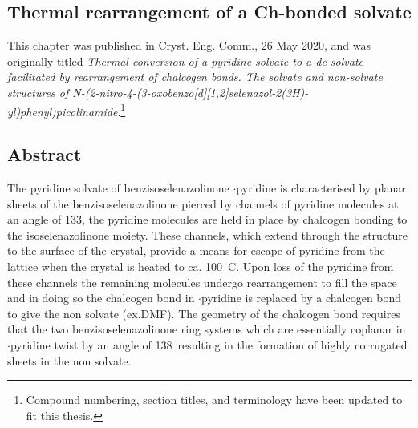 \begin{refsection}

    
    \chapter{Thermal rearrangement of a Ch-bonded solvate}\label{ch:thermal-conversion}
    
    This chapter was published in Cryst. Eng. Comm., 26 May 2020, and was originally titled \emph{Thermal conversion of a pyridine solvate to a de-solvate facilitated by rearrangement of chalcogen bonds. The solvate and non-solvate structures of N-(2-nitro-4-(3-oxobenzo[\emph{d}][1,2]selenazol-2(3\emph{H})-yl)phenyl)picolinamide}\autocite{Fellowes2020a}.\footnote{Compound numbering, section titles, and terminology have been updated to fit this thesis.}
    
    \section{Abstract}
    The pyridine solvate of benzisoselenazolinone $\cdot$pyridine is characterised by planar sheets of the benzisoselenazolinone  pierced by channels of pyridine molecules at an angle of 133\degree, the pyridine molecules are held in place by  chalcogen bonding to the isoselenazolinone moiety.
    These channels, which extend through the structure to the surface of the crystal, provide a means for escape of pyridine from the lattice when the crystal is heated to ca. 100~\degree{}C.
    Upon loss of the pyridine from these channels the remaining molecules undergo rearrangement to fill the space and in doing so the  chalcogen bond in $\cdot$pyridine is replaced by a  chalcogen bond to give the non solvate (ex.DMF).
    The geometry of the chalcogen bond requires that the two benzisoselenazolinone ring systems which are essentially coplanar in $\cdot$pyridine twist by an angle of 138\degree~resulting in the formation of highly corrugated sheets in the non solvate.
    

\end{refsection}
